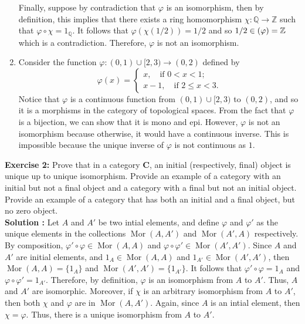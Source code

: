 \documentclass{article}
\newcommand{\Q}{\mathbb{Q}}
\newcommand{\Z}{\mathbb{Z}}
\newcommand{\CatC}{\textbf{C}}
\let\Im\relax
\DeclareMathOperator{\Im}{Im}
\DeclareMathOperator{\Mor}{Mor}
\begin{document}
\begin{enumerate}[label=(\alph*)]
    Finally, suppose by contradiction that $\varphi$ is an isomorphism, then by definition, this implies that there exists a ring homomorphism $\chi : \Q \to \Z$ such that $\varphi \circ \chi = 1_{\Q}$. It follows that $\varphi(\chi(1/2)) = 1/2$ and so $1/2 \in \Im(\varphi) = \Z$ which is a contradiction. Therefore, $\varphi$ is not an isomorphism.
    \item Consider the function $\varphi : (0,1)\cup [2, 3) \to (0,2)$ defined by
    $$\varphi(x) = \begin{cases}
        x, \quad \text{if } 0< x < 1; \\
        x-1, \quad \text{if } 2 \leq x < 3.
    \end{cases}$$
    Notice that $\varphi$ is a continuous function from $(0,1)\cup [2, 3)$ to $(0,2)$, and so it is a morphisms in the category of topological spaces. From the fact that $\varphi$ is a bijection, we can show that it is mono and epi. However, $\varphi$ is not an isomorphism because otherwise, it would have a continuous inverse. This is impossible because the unique inverse of $\varphi$ is not continuous as $1$. 
\end{enumerate}

\newpage

\noindent \textbf{Exercise 2:} Prove that in a category $\CatC$, an initial (respectively, final) object is unique up to unique isomorphism. Provide an example of a category with an initial but not a final object and a category with a final but not an initial object. Provide an example of a category that has both an initial and a final object, but no zero object. \\

\noindent \textbf{Solution :} Let $A$ and $A'$ be two intial elements, and define $\varphi$ and $\varphi'$ as the unique elements in the collections $\Mor(A,A')$ and $\Mor(A', A)$ respectively. By composition, $\varphi' \circ \varphi \in \Mor(A,A)$ and $\varphi \circ \varphi' \in \Mor(A',A')$. Since $A$ and $A'$ are initial elements, and $1_A \in \Mor(A,A)$ and $1_{A'} \in \Mor(A', A')$, then $\Mor(A, A) = \{1_{A}\}$ and $\Mor(A', A') = \{1_{A'}\}$. It follows that $\varphi' \circ \varphi = 1_A$ and $\varphi \circ \varphi' = 1_{A'}$. Therefore, by definition, $\varphi$ is an isomorphism from $A$ to $A'$. Thus, $A$ and $A'$ are isomorphic. Moreover, if $\chi$ is an arbitrary isomorphism from $A$ to $A'$, then both $\chi$ and $\varphi$ are in $\Mor(A,A')$. Again, since $A$ is an intial element, then $\chi = \varphi$. Thus, there is a unique isomorphism from $A$ to $A'$.
\end{document}
